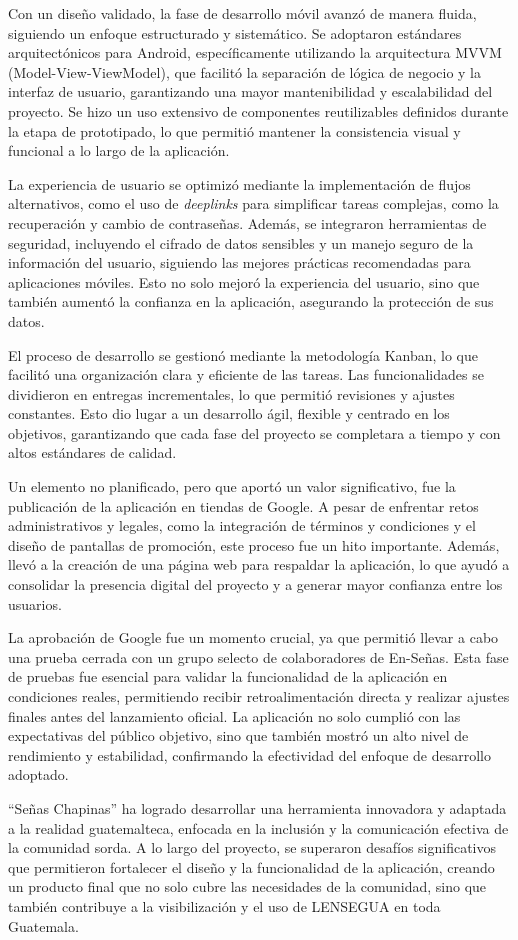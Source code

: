 Con un diseño validado, la fase de desarrollo móvil avanzó de manera fluida, siguiendo un enfoque estructurado y sistemático. Se adoptaron estándares arquitectónicos para Android, específicamente utilizando la arquitectura MVVM (Model-View-ViewModel), que facilitó la separación de lógica de negocio y la interfaz de usuario, garantizando una mayor mantenibilidad y escalabilidad del proyecto. Se hizo un uso extensivo de componentes reutilizables definidos durante la etapa de prototipado, lo que permitió mantener la consistencia visual y funcional a lo largo de la aplicación.

La experiencia de usuario se optimizó mediante la implementación de flujos alternativos, como el uso de \textit{deeplinks} para simplificar tareas complejas, como la recuperación y cambio de contraseñas. Además, se integraron herramientas de seguridad, incluyendo el cifrado de datos sensibles y un manejo seguro de la información del usuario, siguiendo las mejores prácticas recomendadas para aplicaciones móviles. Esto no solo mejoró la experiencia del usuario, sino que también aumentó la confianza en la aplicación, asegurando la protección de sus datos.

El proceso de desarrollo se gestionó mediante la metodología Kanban, lo que facilitó una organización clara y eficiente de las tareas. Las funcionalidades se dividieron en entregas incrementales, lo que permitió revisiones y ajustes constantes. Esto dio lugar a un desarrollo ágil, flexible y centrado en los objetivos, garantizando que cada fase del proyecto se completara a tiempo y con altos estándares de calidad.

Un elemento no planificado, pero que aportó un valor significativo, fue la publicación de la aplicación en tiendas de Google. A pesar de enfrentar retos administrativos y legales, como la integración de términos y condiciones y el diseño de pantallas de promoción, este proceso fue un hito importante. Además, llevó a la creación de una página web para respaldar la aplicación, lo que ayudó a consolidar la presencia digital del proyecto y a generar mayor confianza entre los usuarios.

La aprobación de Google fue un momento crucial, ya que permitió llevar a cabo una prueba cerrada con un grupo selecto de colaboradores de En-Señas. Esta fase de pruebas fue esencial para validar la funcionalidad de la aplicación en condiciones reales, permitiendo recibir retroalimentación directa y realizar ajustes finales antes del lanzamiento oficial. La aplicación no solo cumplió con las expectativas del público objetivo, sino que también mostró un alto nivel de rendimiento y estabilidad, confirmando la efectividad del enfoque de desarrollo adoptado.

``Señas Chapinas'' ha logrado desarrollar una herramienta innovadora y adaptada a la realidad guatemalteca, enfocada en la inclusión y la comunicación efectiva de la comunidad sorda. A lo largo del proyecto, se superaron desafíos significativos que permitieron fortalecer el diseño y la funcionalidad de la aplicación, creando un producto final que no solo cubre las necesidades de la comunidad, sino que también contribuye a la visibilización y el uso de LENSEGUA en toda Guatemala.

